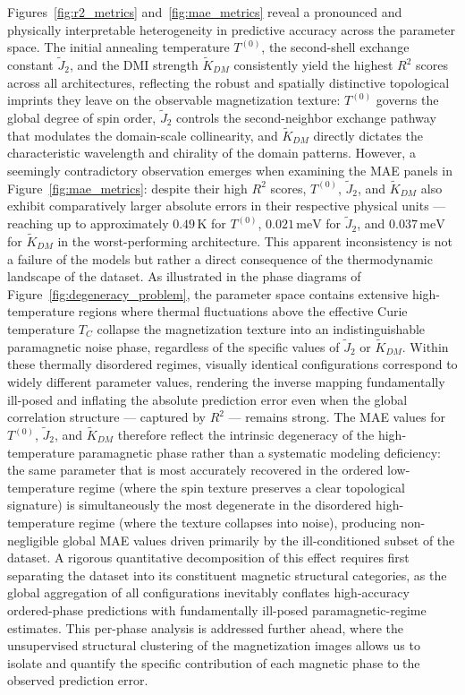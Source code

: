 \documentclass[letterpaper, 12, one column]{article}
\begin{document}
Figures~\ref{fig:r2_metrics} and~\ref{fig:mae_metrics} reveal a
pronounced and physically interpretable heterogeneity in predictive
accuracy across the parameter space. The initial annealing temperature
$T^{(0)}$, the second-shell exchange constant $\tilde{J}_2$, and the
DMI strength $\tilde{K}_{DM}$ consistently yield the highest $R^2$
scores across all architectures, reflecting the robust and spatially
distinctive topological imprints they leave on the observable
magnetization texture: $T^{(0)}$ governs the global degree of spin
order, $\tilde{J}_2$ controls the second-neighbor exchange pathway
that modulates the domain-scale collinearity, and $\tilde{K}_{DM}$
directly dictates the characteristic wavelength and chirality of the
domain patterns. However, a seemingly contradictory observation
emerges when examining the MAE panels in Figure~\ref{fig:mae_metrics}:
despite their high $R^2$ scores, $T^{(0)}$, $\tilde{J}_2$, and
$\tilde{K}_{DM}$ also exhibit comparatively larger absolute errors in
their respective physical units --- reaching up to approximately
$0.49\,\mathrm{K}$ for $T^{(0)}$, $0.021\,\mathrm{meV}$ for
$\tilde{J}_2$, and $0.037\,\mathrm{meV}$ for $\tilde{K}_{DM}$ in the
worst-performing architecture. This apparent inconsistency is not a
failure of the models but rather a direct consequence of the
thermodynamic landscape of the dataset. As illustrated in the phase diagrams of Figure~\ref{fig:degeneracy_problem}, the parameter space
contains extensive high-temperature regions where thermal
fluctuations above the effective Curie temperature $T_C$ collapse the
magnetization texture into an indistinguishable paramagnetic noise
phase, regardless of the specific values of $\tilde{J}_2$ or
$\tilde{K}_{DM}$. Within these thermally disordered regimes, visually
identical configurations correspond to widely different parameter
values, rendering the inverse mapping fundamentally ill-posed and
inflating the absolute prediction error even when the global
correlation structure --- captured by $R^2$ --- remains strong. The
MAE values for $T^{(0)}$, $\tilde{J}_2$, and $\tilde{K}_{DM}$
therefore reflect the intrinsic degeneracy of the high-temperature
paramagnetic phase rather than a systematic modeling deficiency: the
same parameter that is most accurately recovered in the ordered
low-temperature regime (where the spin texture preserves a clear
topological signature) is simultaneously the most degenerate in the
disordered high-temperature regime (where the texture collapses into
noise), producing non-negligible global MAE values driven primarily
by the ill-conditioned subset of the dataset. A rigorous quantitative
decomposition of this effect requires first separating the dataset
into its constituent magnetic structural categories, as the global
aggregation of all configurations inevitably conflates high-accuracy
ordered-phase predictions with fundamentally ill-posed
paramagnetic-regime estimates. This per-phase analysis is addressed
further ahead, where the unsupervised structural clustering of the
magnetization images allows us to isolate and quantify the specific
contribution of each magnetic phase to the observed prediction error.
\end{document}
